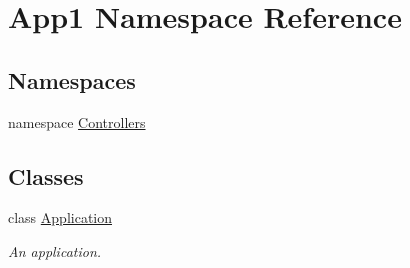 \hypertarget{namespace_app1}{}\section{App1 Namespace Reference}
\label{namespace_app1}
\subsection*{Namespaces}
\begin{DoxyCompactItemize}
\item 
namespace \hyperlink{namespace_app1_1_1_controllers}{Controllers}
\end{DoxyCompactItemize}
\subsection*{Classes}
\begin{DoxyCompactItemize}
\item 
class \hyperlink{class_app1_1_1_application}{Application}
\begin{DoxyCompactList}\small\item\em An application. \end{DoxyCompactList}\end{DoxyCompactItemize}
